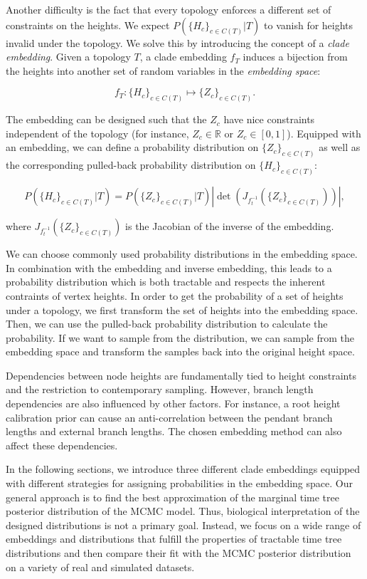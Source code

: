 \documentclass[10pt,letterpaper]{article}
\begin{document}
Another difficulty is the fact that every topology enforces a different set of constraints on the heights. We expect $P\left(\{H_c\}_{c \in C(T)} | T\right)$ to vanish for heights invalid under the topology. We solve this by introducing the concept of a \emph{clade embedding}. Given a topology $T$, a clade embedding $f_T$ induces a bijection from the heights into another set of random variables in the \emph{embedding space}:

$$
f_T: \{H_c\}_{c \in C(T)} \mapsto \{Z_c\}_{c \in C(T)}.
$$

The embedding can be designed such that the $Z_c$ have nice constraints independent of the topology (for instance, $Z_c \in \mathbb{R}$ or $Z_c \in [0, 1]$). Equipped with an embedding, we can define a probability distribution on $\{Z_c\}_{c \in C(T)}$ as well as the corresponding pulled-back probability distribution on $\{H_c\}_{c \in C(T)}$:

$$
P\left(\{H_c\}_{c \in C(T)} | T\right) = P\left(\{Z_c\}_{c \in C(T)} | T\right) \left| \det{\left(J_{f_t^{-1}}(\{Z_c\}_{c \in C(T)})\right)} \right|,
$$

where $J_{f_t^{-1}}(\{Z_c\}_{c \in C(T)})$ is the Jacobian of the inverse of the embedding.

We can choose commonly used probability distributions in the embedding space. In combination with the embedding and inverse embedding, this leads to a probability distribution which is both tractable and respects the inherent contraints of vertex heights. In order to get the probability of a set of heights under a topology, we first transform the set of heights into the embedding space. Then, we can use the pulled-back probability distribution to calculate the probability. If we want to sample from the distribution, we can sample from the embedding space and transform the samples back into the original height space.

Dependencies between node heights are fundamentally tied to height constraints and the restriction to contemporary sampling. However, branch length dependencies are also influenced by other factors. For instance, a root height calibration prior can cause an anti-correlation between the pendant branch lengths and external branch lengths. The chosen embedding method can also affect these dependencies.

In the following sections, we introduce three different clade embeddings equipped with different strategies for assigning probabilities in the embedding space. Our general approach is to find the best approximation of the marginal time tree posterior distribution of the MCMC model. Thus, biological interpretation of the designed distributions is not a primary goal. Instead, we focus on a wide range of embeddings and distributions that fulfill the properties of tractable time tree distributions and then compare their fit with the MCMC posterior distribution on a variety of real and simulated datasets.
\end{document}
